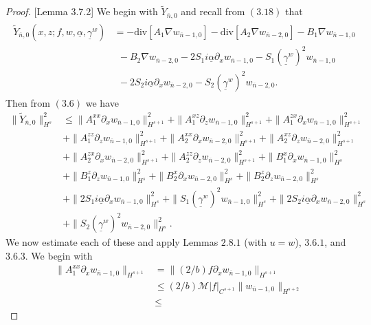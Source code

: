 \begin{proof}{[Lemma 3.7.2]} We begin with $\tilde{Y}_{\overline{n},0}$ and recall from $(3.18)$ that
\begin{align}
\begin{split}
\tilde{Y}_{\overline{n},0}\left(x,z;f,w,\underline{\alpha},\underline{\gamma}^w\right)&=-\text{div}[A_1\nabla w_{\overline{n}-1,0}]-\text{div}[A_2\nabla w_{\overline{n}-2,0}]-B_1\nabla w_{\overline{n}-1,0} 
\\&~~- B_2\nabla w_{\overline{n}-2,0}-2S_1i\underline{\alpha}\partial_xw_{\overline{n}-1,0}-S_1(\underline{\gamma}^w)^2w_{\overline{n}-1,0}
\\&~~-2S_2i\underline{\alpha}\partial_xw_{\overline{n}-2,0}-S_2(\underline{\gamma}^w)^2w_{\overline{n}-2,0}.
\end{split}
\end{align}
Then from $(3.6)$ we have
\begin{align*}
\|\tilde{Y}_{\overline{n},0}\|_{H^{s}}^2&\le \|A_1^{xx}\partial_x w_{\overline{n}-1,0}\|_{H^{s+1}}^2 + \|A_1^{xz}\partial_z w_{\overline{n}-1,0}\|_{H^{s+1}}^2 + \|A_1^{zx}\partial_x w_{\overline{n}-1,0}\|_{H^{s+1}}^2 \\&+
\|A_1^{zz}\partial_z w_{\overline{n}-1,0}\|_{H^{s+1}}^2 + \|A_2^{xx}\partial_x w_{\overline{n}-2,0}\|_{H^{s+1}}^2 + \|A_2^{xz}\partial_z w_{\overline{n}-2,0}\|_{H^{s+1}}^2 \\&+
\|A_2^{zx}\partial_x w_{\overline{n}-2,0}\|_{H^{s+1}}^2 + \|A_2^{zz}\partial_z w_{\overline{n}-2,0}\|_{H^{s+1}}^2 + \|B_1^{x}\partial_x w_{\overline{n}-1,0}\|_{H^{s}}^2 \\&+
\|B_1^{z}\partial_z w_{\overline{n}-1,0}\|_{H^{s}}^2 +
\|B_2^{x}\partial_x w_{\overline{n}-2,0}\|_{H^{s}}^2 +
\|B_2^{z}\partial_z w_{\overline{n}-2,0}\|_{H^{s}}^2 \\&+
\|2S_1i\underline{\alpha}\partial_xw_{\overline{n}-1,0}\|_{H^{s}}^2 + \|S_1(\underline{\gamma}^w)^2w_{\overline{n}-1,0}\|_{H^{s}}^2+\|2S_2i\underline{\alpha}\partial_xw_{\overline{n}-2,0}\|_{H^{s}}^2\\&+
\|S_2(\underline{\gamma}^w)^2w_{\overline{n}-2,0}\|_{H^{s}}^2.
\end{align*}
We now estimate each of these and apply Lemmas $2.8.1$ (with $u=w$), $3.6.1$, and $3.6.3$. We begin with
\begin{align*}
\|A_1^{xx}\partial_x w_{\overline{n}-1,0}\|_{H^{s+1}} &= 
\|(2/b)f\partial_xw_{\overline{n}-1,0}\|_{H^{s+1}}\\&\le
(2/b)\mathcal{M}|f|_{C^{s+1}}\|w_{\overline{n}-1,0}\|_{H^{s+2}}\\&\le

\end{align*}
\end{proof}
